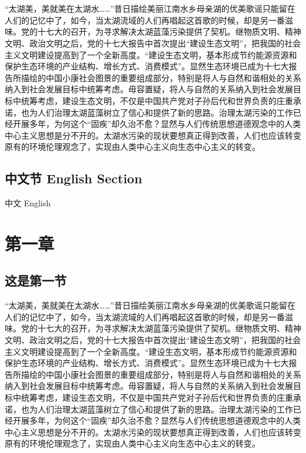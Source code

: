 \chapter{}

“太湖美，美就美在太湖水……”昔日描绘美丽江南水乡母亲湖的优美歌谣只能留在人们的记忆中了，如今，当太湖流域的人们再唱起这首歌的时候，却是另一番滋味。党的十七大的召开，为寻求解决太湖蓝藻污染提供了契机。继物质文明、精神文明、政治文明之后，党的十七大报告中首次提出“建设生态文明”，把我国的社会主义文明建设提高到了一个全新高度。“建设生态文明，基本形成节约能源资源和保护生态环境的产业结构、增长方式、消费模式”。显然生态环境已成为十七大报告所描绘的中国小康社会图景的重要组成部分，特别是将人与自然和谐相处的关系纳入到社会发展目标中统筹考虑。毋容置疑，将人与自然的关系纳入到社会发展目标中统筹考虑，建设生态文明，不仅是中国共产党对子孙后代和世界负责的庄重承诺，也为人们治理太湖蓝藻树立了信心和提供了新的思路。治理太湖污染的工作已经开展多年，为何这个“固疾”却久治不愈？显然与人们传统思想道德观念中的人类中心主义思想是分不开的。太湖水污染的现状要想真正得到改善，人们也应该转变原有的环境伦理观念了，实现由人类中心主义向生态中心主义的转变。

\section{中文节 English Section}

\newpage

{\heiti 中文 English}

\chapter{第一章}

\section{这是第一节}


 “太湖美，美就美在太湖水……”昔日描绘美丽江南水乡母亲湖的优美歌谣只能留在人们的记忆中了，如今，当太湖流域的人们再唱起这首歌的时候，却是另一番滋味。党的十七大的召开，为寻求解决太湖蓝藻污染提供了契机。继物质文明、精神文明、政治文明之后，党的十七大报告中首次提出“建设生态文明”，把我国的社会主义文明建设提高到了一个全新高度。“建设生态文明，基本形成节约能源资源和保护生态环境的产业结构、增长方式、消费模式”。显然生态环境已成为十七大报告所描绘的中国小康社会图景的重要组成部分，特别是将人与自然和谐相处的关系纳入到社会发展目标中统筹考虑。毋容置疑，将人与自然的关系纳入到社会发展目标中统筹考虑，建设生态文明，不仅是中国共产党对子孙后代和世界负责的庄重承诺，也为人们治理太湖蓝藻树立了信心和提供了新的思路。治理太湖污染的工作已经开展多年，为何这个“固疾”却久治不愈？显然与人们传统思想道德观念中的人类中心主义思想是分不开的。太湖水污染的现状要想真正得到改善，人们也应该转变原有的环境伦理观念了，实现由人类中心主义向生态中心主义的转变。

